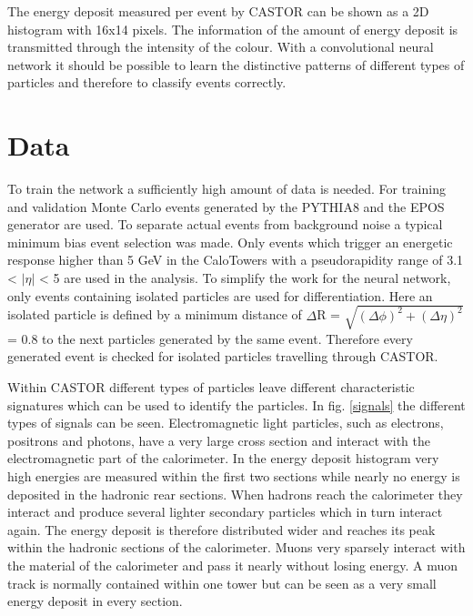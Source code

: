 The energy deposit measured per event by CASTOR can be shown as a 2D histogram with 16x14 pixels. The information of the amount of energy deposit is transmitted through the intensity of the colour. With a convolutional neural network it should be possible to learn the distinctive patterns of different types of particles and therefore to classify events correctly. 

\section{Data}
To train the network a sufficiently high amount of data is needed. For training and validation Monte Carlo events generated by the PYTHIA8 and the EPOS generator are used. To separate actual events from background noise a typical minimum bias event selection was made. Only events which trigger an energetic response higher than 5 GeV in the CaloTowers with a pseudorapidity range of 3.1 < $|\eta|$ < 5 are used in the analysis. To simplify the work for the neural network, only events containing isolated particles are used for differentiation. Here an isolated particle is defined by a minimum distance of $\Delta$R = $\sqrt{(\Delta \phi)^2 + (\Delta \eta)^2}$ = 0.8 to the next particles generated by the same event. Therefore every generated event is checked for isolated particles travelling through CASTOR.

Within CASTOR different types of particles leave different characteristic signatures which can be used to identify the particles. In fig. \ref{signals} the different types of signals can be seen. Electromagnetic light particles, such as electrons, positrons and photons, have a very large cross section and interact with the electromagnetic part of the calorimeter. In the energy deposit histogram very high energies are measured within the first two sections while nearly no energy is deposited in the hadronic rear sections.
When hadrons reach the calorimeter they interact and produce several lighter secondary particles which in turn interact again. The energy deposit is therefore distributed wider and reaches its peak within the hadronic sections of the calorimeter.
Muons very sparsely interact with the material of the calorimeter and pass it nearly without losing energy. A muon track is normally contained within one tower but can be seen as a very small energy deposit in every section.

